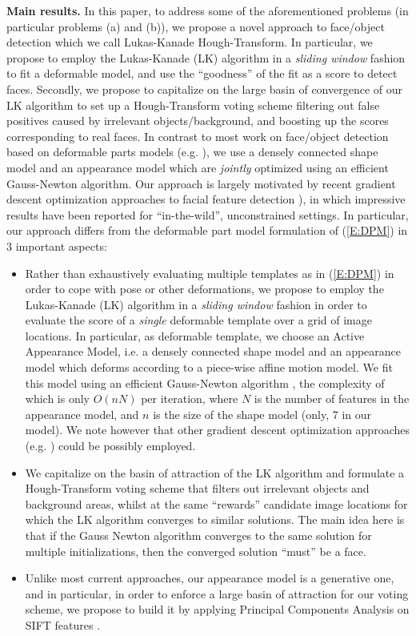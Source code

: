 \documentclass[runningheads]{llncs}
\begin{document}
\textbf{Main results.} In this paper, to address some of the aforementioned problems (in particular problems (a) and (b)), we propose a novel approach to face/object detection which we call Lukas-Kanade Hough-Transform. In particular, we propose to employ the Lukas-Kanade (LK) algorithm in a \textit{sliding window} fashion to fit a deformable model, and use the ``goodness'' of the fit as a score to detect faces. Secondly, we propose to capitalize on the large basin of convergence of our LK algorithm to set up a Hough-Transform voting scheme filtering out false positives caused by irrelevant objects/background, and boosting up the scores corresponding to real faces. In contrast to most work on face/object detection based on deformable parts models (e.g. \cite{felzenszwalb2010object, ramanan2011}), we use a densely connected shape model and an appearance model which are \textit{jointly} optimized using an efficient Gauss-Newton algorithm. Our approach is largely motivated by recent gradient descent optimization approaches to facial feature detection \cite{xiongsupervised, tzimiropoulosoptimization}), in which impressive results have been reported for ``in-the-wild'', unconstrained settings. In particular, our approach differs from the deformable part model formulation of (\ref{E:DPM}) in 3 important aspects:
\begin{itemize}
\item
Rather than exhaustively evaluating multiple templates as in (\ref{E:DPM}) in order to cope with pose or other deformations, we propose to employ the Lukas-Kanade (LK) algorithm in a \textit{sliding window} fashion in order to evaluate the score of a \textit{single} deformable template over a grid of image locations. In particular, as deformable template, we choose an Active Appearance Model, i.e. a densely connected shape model and an appearance model which deforms according to a piece-wise affine motion model. We fit this model using an efficient Gauss-Newton algorithm \cite{matthews2004active}, the complexity of which is only $O(nN)$ per iteration, where $N$ is the number of features in the appearance model, and $n$ is the size of the shape model (only, 7 in our model). We note however that other gradient descent optimization approaches (e.g. \cite{xiongsupervised}) could be possibly employed.
\item 
We capitalize on the basin of attraction of the LK algorithm and formulate a Hough-Transform voting scheme that filters out irrelevant objects and background areas, whilst at the same ``rewards'' candidate image locations for which the LK algorithm converges to similar solutions. The main idea here is that if the Gauss Newton algorithm converges to the same solution for multiple initializations, then the converged solution ``must'' be a face.
\item 
Unlike most current approaches, our appearance model is a generative one, and in particular, in order to enforce a large basin of attraction for our voting scheme, we propose to build it by applying Principal Components Analysis on SIFT features \cite{lowe2004distinctive}.
\end{itemize}
\end{document}

